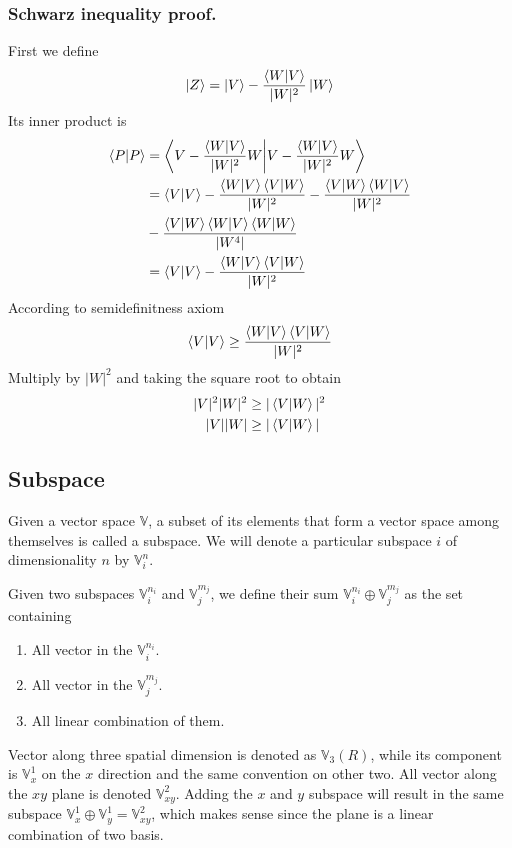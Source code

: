 \documentclass[../main.tex]{subfiles}
\begin{document}
\subsubsection{Schwarz inequality proof.}
First we define
\begin{equation*}
	\ket{Z}=\ket{V}-\frac{\braket{W|V }}{|W|^2}\ket{W}
\end{equation*}
Its inner product is
\begin{align*}
	\braket{P|P} & =\bigg\langle V-\frac{\braket{W|V }}{|W|^2} W\bigg|V-\frac{\braket{W|V }}{|W|^2}W\bigg\rangle    \\
	             & =\braket{V|V} -\frac{\braket{W|V }\braket{V|W }}{|W|^2}-\frac{\braket{V|W }\braket{W|V }}{|W|^2} \\
	             & -\frac{\braket{V|W }\braket{W|V }\braket{W|W}}{|W^4|}                                            \\
	             & =\braket{V|V}-\frac{\braket{W|V }\braket{V|W }}{|W|^2}
\end{align*}
According to semidefinitness axiom
\begin{equation*}
	\braket{V|V}\geq \frac{\braket{W|V }\braket{ V|W}}{|W|^2}
\end{equation*}
Multiply by $|W|^2$ and taking the square root to obtain
\begin{align*}
	|V|^2|W|^2 & \geq|\braket{V|W}|^2 \\
	|V||W|     & \geq|\braket{V|W}|
\end{align*}

\subsection{Subspace}
Given a vector space $\mathbb{V}$, a subset of its elements that form a vector space among themselves is called a subspace.
We will denote a particular subspace $i$ of dimensionality $n$ by $\mathbb{V}_i^n$.

Given two subspaces $\mathbb{V}_i^{n_i}$ and $\mathbb{V}_j^{m_j}$, we define their sum $\mathbb{V}_i^{n_i}\oplus\mathbb{V}_j^{m_j}$ as the set containing
\begin{enumerate}
	\item All vector in the $\mathbb{V}_i^{n_i}$.
	\item All vector in the $\mathbb{V}_j^{m_j}$.
	\item All linear combination of them.
\end{enumerate}

Vector along three spatial dimension is denoted as $\mathbb{V}_3(R)$, while its component is $\mathbb{V}_x^1$ on the $x$ direction and the same convention on other two.
All vector along the $xy$ plane is denoted $\mathbb{V}_{xy}^2$.
Adding the $x$ and $y$ subspace will result in the same subspace $\mathbb{V}_x^1\oplus \mathbb{V}_y^1=\mathbb{V}_{xy}^2$, which makes sense since the plane is a linear combination of two basis.
\end{document}
